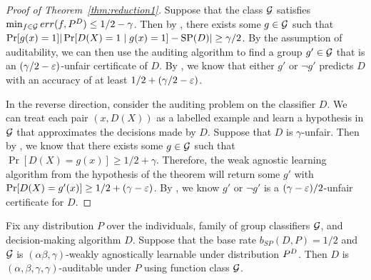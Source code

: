 \begin{proof}[Proof of Theorem~\ref{thm:reduction1}]
  Suppose that the class $\mathcal{G}$ satisfies
  $\min_{f\in \mathcal{G}} err(f, P^D) \leq 1/2 - \gamma$. Then by
  , there exists some $g\in \mathcal{G}$ such that
  $\Pr[g(x) = 1]|\Pr[D(X) = 1 \mid g(x) = 1] - \mathrm{SP}(D)| \geq
  \gamma/2$.  By the assumption of auditability, we can then use the
  auditing algorithm to find a group $g'\in \mathcal{G}$ that is an
  $(\gamma/2 - \varepsilon)$-unfair certificate of $D$.  By ,
  we know that either $g'$ or $\neg g'$ predicts $D$ with an accuracy
  of at least $1/2 + (\gamma/2 - \varepsilon)$.


  In the reverse direction, consider the auditing problem on the
  classifier $D$.  We can treat each pair $(x, D(X))$ as a labelled
  example and learn a hypothesis in $\mathcal{G}$ that approximates the
  decisions made by $D$.  Suppose that $D$ is $\gamma$-unfair. Then by
  , we know that there exists some $g\in \mathcal{G}$ such that
  $\Pr[D(X) = g(x)] \geq 1/2 + \gamma$. Therefore, the weak agnostic
  learning algorithm from the hypothesis of the theorem will return
  some $g'$ with $\Pr[D(X) = g'(x)] \geq 1/2 + (\gamma - \varepsilon)$. By
  , we know $g'$ or $\neg g'$ is a
  $(\gamma - \varepsilon)/2$-unfair certificate for $D$.
\end{proof}

\iffalse
\begin{theorem}\label{red2}
  Fix any distribution $P$ over the individuals, family of group
  classifiers $\mathcal{G}$, and decision-making algorithm $D$.  Suppose that
  the base rate $b_{SP}(D, P) = 1/2$ and $\mathcal{G}$ is
  $(\alpha\beta, \gamma)$-weakly agnostically learnable under
  distribution $P^D$. Then $D$ is
  $(\alpha, \beta, \gamma, \gamma)$-auditable under $P$ using function
  class $\mathcal{G}$.
\end{theorem}

